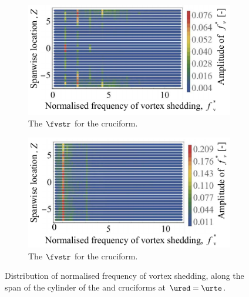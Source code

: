 \documentclass[a4paper,fleqn]{cas-sc}
\begin{document}
\begin{figure}
  \centering

  \begin{subfigure}[h]{0.46\textwidth}
    \includegraphics[width=\textwidth]{figs/probe225YU10}
    \caption{The $\fvstr$ for the \angtw{} cruciform.}
    \label{fig:probe225YU10}
  \end{subfigure}
  \hspace{6mm}
  \begin{subfigure}[h]{0.46\textwidth}
    \includegraphics[width=\textwidth]{figs/probe00YU10}
    \caption{The $\fvstr$ for the \angon{} cruciform.}
    \label{fig:probe00YU10}
  \end{subfigure}

  \caption{Distribution of normalised frequency of vortex shedding, along the span of the cylinder of the \angtw{} and \angon{} cruciforms at $\ured = \urte$.}
  \label{fig:probe22500YU10}
\end{figure}
\end{document}
